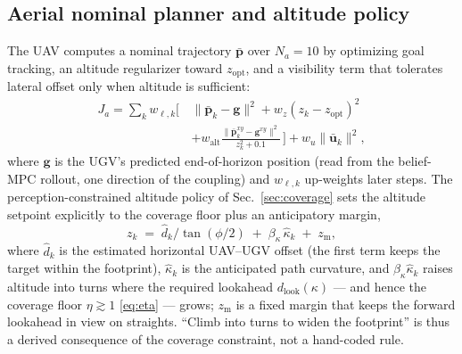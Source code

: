 \documentclass[letterpaper, 10 pt, conference]{ieeeconf}  %
\begin{document}
\subsection{Aerial nominal planner and altitude policy}
\label{sec:aerial}
The UAV computes a nominal trajectory $\bar{\mathbf{p}}$ over $N_a=10$ by
optimizing goal tracking, an altitude regularizer toward $z_{\mathrm{opt}}$, and a
visibility term that tolerates lateral offset only when altitude is sufficient:
\begin{equation}
\begin{aligned}
J_a = \sum_{k}w_{\ell,k}\Big[\,
&\lVert\bar{\mathbf{p}}_k-\mathbf{g}\rVert^2
+ w_z(z_k-z_{\mathrm{opt}})^2 \\[-1pt]
&+ w_{\mathrm{alt}}\frac{\lVert\bar{\mathbf{p}}^{xy}_k-\mathbf{g}^{xy}\rVert^2}{z_k^2+0.1}
\,\Big] + w_u\lVert\bar{\mathbf{u}}_k\rVert^2,
\end{aligned}
\label{eq:Ja}
\end{equation}
where $\mathbf{g}$ is the UGV's predicted end-of-horizon position (read from the
belief-MPC rollout, one direction of the coupling) and $w_{\ell,k}$ up-weights
later steps. The perception-constrained altitude policy of Sec.~\ref{sec:coverage} sets the
altitude setpoint explicitly to the coverage floor plus an anticipatory margin,
\begin{equation}
z_k \;=\; \hat d_k/\tan(\phi/2) \;+\; \beta_\kappa\,\hat\kappa_k \;+\; z_{\mathrm{m}},
\label{eq:altpol}
\end{equation}
where $\hat d_k$ is the estimated horizontal UAV--UGV offset (the first term keeps the target
within the footprint), $\hat\kappa_k$ is the anticipated path curvature, and
$\beta_\kappa\hat\kappa_k$ raises altitude into turns where the required lookahead
$d_{\mathrm{look}}(\kappa)$ --- and hence the coverage floor $\eta\!\gtrsim\!1$
\eqref{eq:eta} --- grows; $z_{\mathrm{m}}$ is a fixed margin that keeps the forward lookahead in
view on straights. ``Climb into turns to widen the footprint'' is thus a
derived consequence of the coverage constraint, not a hand-coded rule.
\end{document}
